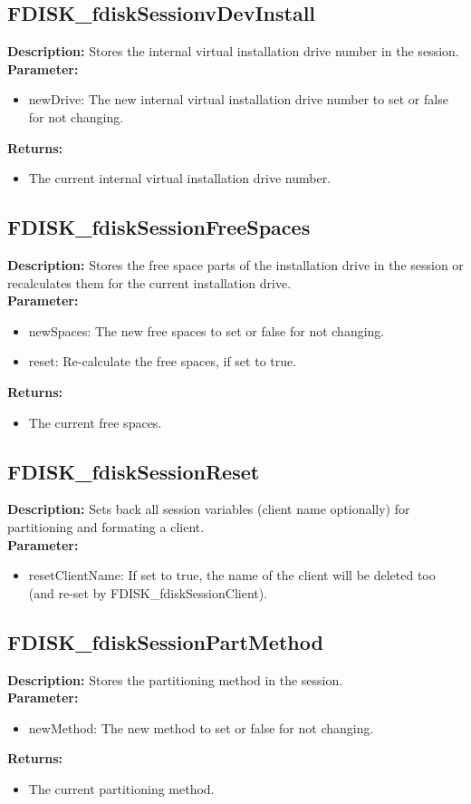 \subsection{FDISK\_fdiskSessionvDevInstall}
\textbf{Description:} Stores the internal virtual installation drive number in the session.\\
\textbf{Parameter:}
\begin{itemize}
\item newDrive: The new internal virtual installation drive number to set or false for not changing.
\end{itemize}
\textbf{Returns:}
\begin{itemize}
\item The current internal virtual installation drive number.
\end{itemize}

\subsection{FDISK\_fdiskSessionFreeSpaces}
\textbf{Description:} Stores the free space parts of the installation drive in the session or recalculates them for the current installation drive.\\
\textbf{Parameter:}
\begin{itemize}
\item newSpaces: The new free spaces to set or false for not changing.
\item reset: Re-calculate the free spaces, if set to true.
\end{itemize}
\textbf{Returns:}
\begin{itemize}
\item The current free spaces.
\end{itemize}

\subsection{FDISK\_fdiskSessionReset}
\textbf{Description:} Sets back all session variables (client name optionally) for partitioning and formating a client.\\
\textbf{Parameter:}
\begin{itemize}
\item resetClientName: If set to true, the name of the client will be deleted too (and re-set by FDISK\_fdiskSessionClient).
\end{itemize}

\subsection{FDISK\_fdiskSessionPartMethod}
\textbf{Description:} Stores the partitioning method in the session.\\
\textbf{Parameter:}
\begin{itemize}
\item newMethod: The new method to set or false for not changing.
\end{itemize}
\textbf{Returns:}
\begin{itemize}
\item The current partitioning method.
\end{itemize}

